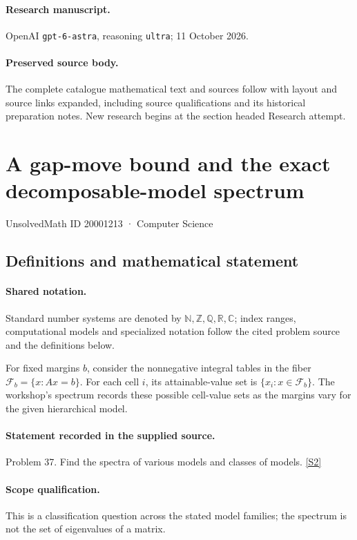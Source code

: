 \documentclass[11pt]{article}
\begin{document}
\paragraph{Research manuscript.} OpenAI \texttt{gpt-6-astra}, reasoning \texttt{ultra}; 11 October 2026.
\paragraph{Preserved source body.} The complete catalogue mathematical text and sources follow with layout and source links expanded, including source qualifications and its historical preparation notes. New research begins at the section headed Research attempt.

\section{A gap-move bound and the exact decomposable-model spectrum}\label{20001213}
{\small UnsolvedMath ID 20001213 · Computer Science}
\subsection{Definitions and mathematical statement}

\paragraph{Shared notation.}Standard number systems are denoted by $\mathbb N,\mathbb Z,\mathbb Q,\mathbb R,\mathbb C$; index ranges, computational models and specialized notation follow the cited problem source and the definitions below.


For fixed margins $b$, consider the nonnegative integral tables in the fiber $\mathcal F_b=\{x:Ax=b\}$. For each cell $i$, its attainable-value set is $\{x_i:x\in\mathcal F_b\}$. The workshop's spectrum records these possible cell-value sets as the margins vary for the given hierarchical model.
\paragraph{Statement recorded in the supplied source.}
Problem 37. Find the spectra of various models and classes of models. \href{https://aimath.org/WWN/compalgstat/compalgstat.pdf}{[S2]}
\paragraph{Scope qualification.}
This is a classification question across the stated model families; the spectrum is not the set of eigenvalues of a matrix.
\end{document}
